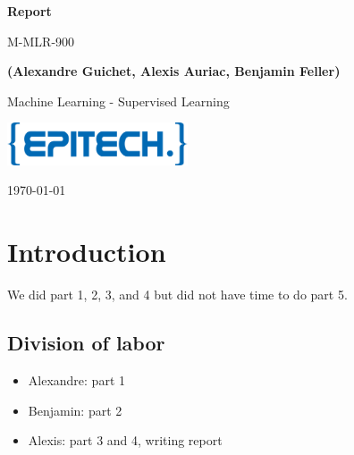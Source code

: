 \documentclass[10pt, a4paper]{article}
\newcommand\course{Machine Learning - Supervised Learning}
\newcommand\hwnumber{M-MLR-900}
\newcommand\Information{(Alexandre Guichet, Alexis Auriac, Benjamin Feller)}
\begin{document}
\begin{titlepage}
    \begin{center}
        \vspace*{3cm}
            
        \Huge
        \textbf{Report}
            
        \vspace{1cm}
        \huge
        \hwnumber
            
        \vspace{1.5cm}
        \Large
            
        \textbf{\Information}                      %
        
            
        \vfill
        
        \course
            
        \vspace{1cm}
            
        \includegraphics[width=0.4\textwidth]{epitech_logo.png}

        \Large
        
        \today
            
    \end{center}
\end{titlepage}

\newpage


\section*{Introduction}

We did part 1, 2, 3, and 4 but did not have time to do part 5.

\subsection*{Division of labor}

\begin{itemize}
    \item Alexandre: part 1
    \item Benjamin: part 2
    \item Alexis: part 3 and 4, writing report
\end{itemize}
\end{document}
